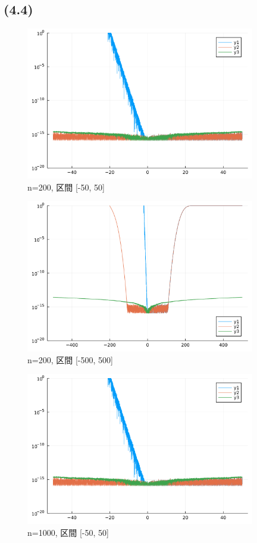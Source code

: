 \documentclass[uplatex, dvipdfmx, a4j,11pt]{jsarticle}
\begin{document}
\subsection*{(4.4)}
\begin{figure}[h]
  \begin{center}
    \includegraphics[width=100mm]{exp200_50.png}
    \caption{n=200, 区間 [-50, 50]}
  \end{center}
\end{figure}
\begin{figure}[h]
  \begin{center}
    \includegraphics[width=100mm]{exp200_500.png}
    \caption{n=200, 区間 [-500, 500]}
  \end{center}
\end{figure}
\begin{figure}[h]
  \begin{center}
    \includegraphics[width=100mm]{exp1000_50.png}
    \caption{n=1000, 区間 [-50, 50]}
  \end{center}
\end{figure}
\end{document}
